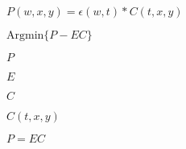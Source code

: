 \documentclass{article}
\begin{document}
$ P(w,x,y) = \epsilon(w,t) * C(t,x,y) $
\pagebreak

$ \text{Argmin} \{ P - EC \} $
\pagebreak

$ P $
\pagebreak

$ E $
\pagebreak

$ C $
\pagebreak

$ C(t,x,y) $
\pagebreak

$ P = EC $
\pagebreak
\end{document}
